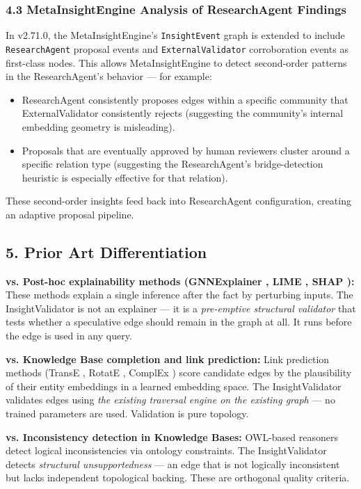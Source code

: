 \subsubsection*{4.3 MetaInsightEngine Analysis of ResearchAgent Findings}
In v2.71.0, the MetaInsightEngine's \texttt{InsightEvent} graph is extended to include \texttt{ResearchAgent} proposal events and \texttt{ExternalValidator} corroboration events as first-class nodes. This allows MetaInsightEngine to detect second-order patterns in the ResearchAgent's behavior --- for example:

\begin{itemize}
  \item ResearchAgent consistently proposes edges within a specific community that ExternalValidator consistently rejects (suggesting the community's internal embedding geometry is misleading).
  \item Proposals that are eventually approved by human reviewers cluster around a specific relation type (suggesting the ResearchAgent's bridge-detection heuristic is especially effective for that relation).
\end{itemize}


These second-order insights feed back into ResearchAgent configuration, creating an adaptive proposal pipeline.

\subsection*{5. Prior Art Differentiation}

\textbf{vs. Post-hoc explainability methods (GNNExplainer \cite{ying2019gnnexplainer}, LIME \cite{ribeiro2016lime}, SHAP \cite{lundberg2017shap}):} These methods explain a single inference after the fact by perturbing inputs. The InsightValidator is not an explainer --- it is a \textit{pre-emptive structural validator} that tests whether a speculative edge should remain in the graph at all. It runs before the edge is used in any query.

\textbf{vs. Knowledge Base completion and link prediction:} Link prediction methods (TransE \cite{bordes2013transe}, RotatE \cite{sun2019rotate}, ComplEx \cite{trouillon2016complex}) score candidate edges by the plausibility of their entity embeddings in a learned embedding space. The InsightValidator validates edges using \textit{the existing traversal engine on the existing graph} --- no trained parameters are used. Validation is pure topology.

\textbf{vs. Inconsistency detection in Knowledge Bases:} OWL-based reasoners \cite{horrocks2004owl} detect logical inconsistencies via ontology constraints. The InsightValidator detects \textit{structural unsupportedness} --- an edge that is not logically inconsistent but lacks independent topological backing. These are orthogonal quality criteria.

